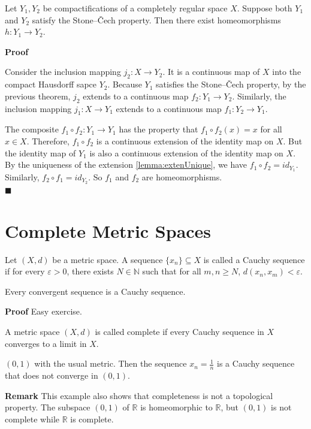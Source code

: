\documentclass[main.tex]{subfiles}
\begin{document}
\begin{theorem}
    Let $Y_1, Y_2$ be compactifications of a completely regular space $X$. Suppose both $Y_1$ and $Y_2$ satisfy the Stone–Čech property. Then there exist homeomorphisms $h: Y_1 \rightarrow Y_2$. 
\end{theorem}
\par \noindent \textbf{Proof} 
\par Consider the inclusion mapping $j_2: X \rightarrow Y_2$. It is a continuous map of $X$ into the compact Hausdorff sapce $Y_2$. Because $Y_1$ satisfies the Stone–Čech property, by the previous theorem, $j_2$ extends to a continuous map $f_2: Y_1 \rightarrow Y_2$. Similarly, the inclusion mapping $j_1: X \rightarrow Y_1$ extends to a continuous map $f_1: Y_2 \rightarrow Y_1$. 
\par The composite $f_1 \circ f_2: Y_1 \rightarrow Y_1$ has the property that $f_1 \circ f_2(x) = x$ for all $x \in X$. Therefore, $f_1 \circ f_2$ is a continuous extension of the identity map on $X$. But the identity map of $Y_1$ is also a continuous extension of the identity map on $X$. By the uniqueness of the extension \ref{lemma:extenUnique}, we have $f_1 \circ f_2 = id_{Y_1}$. Similarly, $f_2 \circ f_1 = id_{Y_2}$. So $f_1$ and $f_2$ are homeomorphisms. 
\mbox{} \\ \null \hfill $\blacksquare$ 


\section{Complete Metric Spaces}

\begin{definition}
    Let $(X, d)$ be a metric space. A sequence $\{x_n\} \subseteq X$ is called a Cauchy sequence if for every $\varepsilon > 0$, there exists $N \in \mathbb{N}$ such that for all $m, n \geq N$, $d(x_n, x_m) < \varepsilon$.
\end{definition}
\begin{property}
    Every convergent sequence is a Cauchy sequence.
\end{property}
\par \noindent \textbf{Proof} Easy exercise. 
\begin{definition}
    A metric space $(X, d)$ is called complete if every Cauchy sequence in $X$ converges to a limit in $X$.
\end{definition}

\begin{example}
    $(0, 1)$ with the usual metric. Then the sequence $x_n = \frac{1}{n}$ is a Cauchy sequence that does not converge in $(0, 1)$.
\end{example}
\par \noindent \textbf{Remark} This example also shows that completeness is not a topological property. The subspace $(0, 1)$ of $\mathbb{R}$ is homeomorphic to $\mathbb{R}$, but $(0, 1)$ is not complete while $\mathbb{R}$ is complete. 
\end{document}
